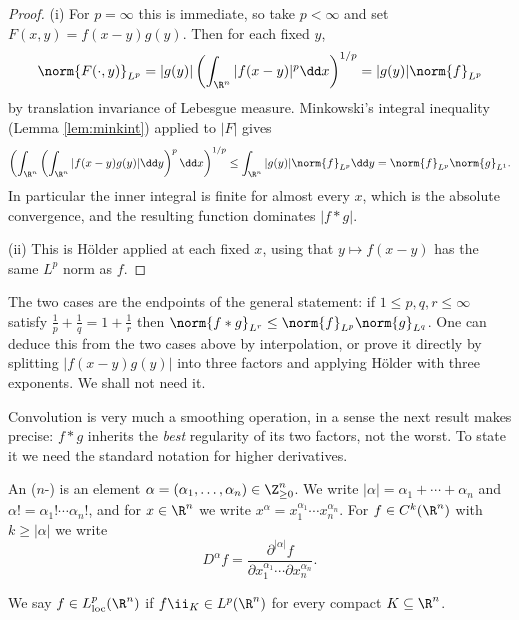 \begin{proof}
	(i) For $p = \infty$ this is immediate, so take $p < \infty$ and set $F(x,y) = f(x-y)g(y)$. Then for each fixed $y$,
	$$\norm{F(\cdot,y)}_{L^p}=|g(y)| \left( \int_{\R^n}|f(x-y)|^p\dd x\right)^{1/p}=|g(y)|\norm{f}_{L^p}$$
	by translation invariance of Lebesgue measure. Minkowski's integral inequality (Lemma \ref{lem:minkint}) applied to $|F|$ gives
	$$\left( \int_{\R^n}\left( \int_{\R^n}|f(x-y)g(y)|\dd y\right)^p\dd x\right)^{1/p}\le\int_{\R^n}|g(y)|\norm{f}_{L^p}\dd y = \norm{f}_{L^p}\norm{g}_{L^1}.$$
	In particular the inner integral is finite for almost every $x$, which is the absolute convergence, and the resulting function dominates $|f*g|$.

	(ii) This is H\"older applied at each fixed $x$, using that $y \mapsto f(x-y)$ has the same $L^p$ norm as $f$.
\end{proof}

\begin{remark}
	The two cases are the endpoints of the general statement: if $1 \le p,q,r\le\infty$ satisfy $\frac1p+\frac1q=1+\frac1r$ then $\norm{f*g}_{L^r}\le\norm{f}_{L^p}\norm{g}_{L^q}$. One can deduce this from the two cases above by interpolation, or prove it directly by splitting $|f(x-y)g(y)|$ into three factors and applying H\"older with three exponents. We shall not need it.
\end{remark}

Convolution is very much a smoothing operation, in a sense the next result makes precise: $f * g$ inherits the \emph{best} regularity of its two factors, not the worst. To state it we need the standard notation for higher derivatives.

\begin{definition}
	An ($n$-) is an element $\alpha = (\alpha_1, \dots, \alpha_n) \in \Z_{\ge 0}^n$. We write $|\alpha| = \alpha_1 + \cdots + \alpha_n$ and $\alpha! = \alpha_1! \cdots \alpha_n!$, and for $x \in \R^n$ we write $x^\alpha = x_1^{\alpha_1} \cdots x_n^{\alpha_n}$. For $f \in C^k(\R^n)$ with $k \ge |\alpha|$ we write
	$$D^\alpha f = \frac{\partial^{|\alpha|} f}{\partial x_1^{\alpha_1} \cdots \partial x_n^{\alpha_n}}.$$
\end{definition}

\begin{definition}
	We say $f \in L^p_{\mathrm{loc}}(\R^n)$ if $f \ii_K \in L^p(\R^n)$ for every compact $K \subseteq \R^n$.
\end{definition}

